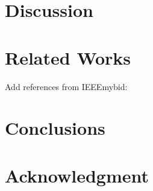 \documentclass{IEEEtran}
\begin{document}
\section{Discussion}\label{sec:discussion}


\section{Related Works}\label{sec:related}
Add references from IEEEmybid: \cite{kumar2014accurate,Estimote}



\section{Conclusions}\label{sec:conclusions}




\section*{Acknowledgment}









%
%
%



%
%
\end{document}

